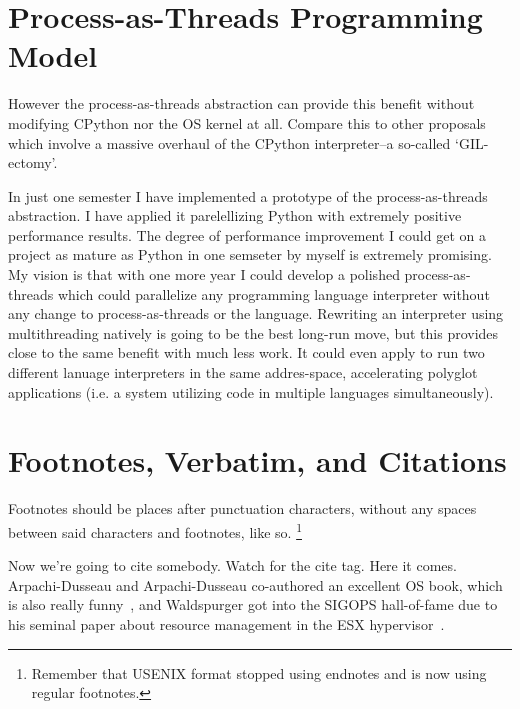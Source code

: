 \documentclass[letterpaper,twocolumn,10pt]{article}
\begin{document}
\section{Process-as-Threads Programming Model}



However the process-as-threads abstraction can provide this benefit without modifying CPython nor the OS kernel at all.
Compare this to other proposals which involve a massive overhaul of the CPython interpreter--a so-called `GIL-ectomy'.

  In just one semester I have implemented a prototype of the process-as-threads abstraction.
  I have applied it parelellizing Python with extremely positive performance results.
  The degree of performance improvement I could get on a project as mature as Python in one semseter by myself is extremely promising.
  My vision is that with one more year I could develop a polished process-as-threads which could parallelize any programming language interpreter without any change to process-as-threads or the language.
  Rewriting an interpreter using multithreading natively is going to be the best long-run move, but this provides close to the same benefit with much less work.
  It could even apply to run two different lanuage interpreters in the same addres-space, accelerating polyglot applications (i.e. a system utilizing code in multiple languages simultaneously).

\section{Footnotes, Verbatim, and Citations}

Footnotes should be places after punctuation characters, without any
spaces between said characters and footnotes, like so.%
\footnote{Remember that USENIX format stopped using endnotes and is
  now using regular footnotes.}

Now we're going to cite somebody. Watch for the cite tag. Here it
comes. Arpachi-Dusseau and Arpachi-Dusseau co-authored an excellent OS
book, which is also really funny~\cite{arpachiDusseau18:osbook}, and
Waldspurger got into the SIGOPS hall-of-fame due to his seminal paper
about resource management in the ESX hypervisor~\cite{waldspurger02}.
\end{document}
